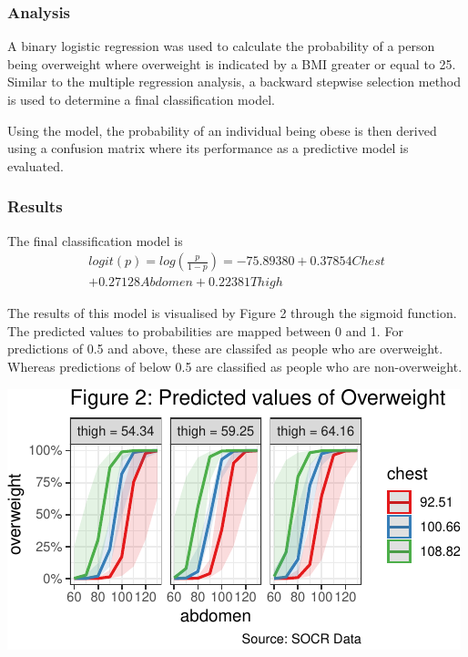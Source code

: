 \documentclass[a4paper,9pt,twocolumn,twoside,]{pinp}
\begin{document}
\hypertarget{analysis-2}{%
\subsubsection{Analysis}\label{analysis-2}}

A binary logistic regression was used to calculate the probability of a
person being overweight where overweight is indicated by a BMI greater
or equal to 25. Similar to the multiple regression analysis, a backward
stepwise selection method is used to determine a final classification
model.

Using the model, the probability of an individual being obese is then
derived using a confusion matrix where its performance as a predictive
model is evaluated.

\hypertarget{results-1}{%
\subsubsection{Results}\label{results-1}}

The final classification model is \[
\begin{aligned}
logit(p)=log(\frac{p}{1-p})=-75.89380+0.37854Chest\\ +0.27128Abdomen+0.22381Thigh
\end{aligned}
\]

The results of this model is visualised by Figure 2 through the sigmoid
function. The predicted values to probabilities are mapped between 0 and
1. For predictions of 0.5 and above, these are classifed as people who
are overweight. Whereas predictions of below 0.5 are classified as
people who are non-overweight.

\begin{center}\includegraphics{Executive_Report_files/figure-latex/unnamed-chunk-2-1} \end{center}
\end{document}
